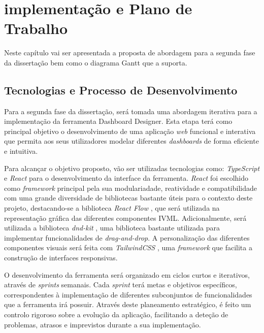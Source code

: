 
%

\chapter{implementação e Plano de Trabalho}
\label{cha:abordagem_plano}

Neste capítulo vai ser apresentada a proposta de abordagem para a segunda fase da dissertação bem como o diagrama Gantt que a suporta. 

\section{Tecnologias e Processo de Desenvolvimento} %
\label{sec:tecnologias_processo}

Para a segunda fase da dissertação, será tomada uma abordagem iterativa para a implementação da ferramenta Dashboard Designer. Esta etapa terá como principal objetivo o desenvolvimento de uma aplicação \textit{web} funcional e interativa que permita aos seus utilizadores modelar diferentes \textit{dashboards} de forma eficiente e intuitiva.

Para alcançar o objetivo proposto, vão ser utilizadas tecnologias como: \textit{TypeScript} \cite{typescript} e \textit{React} \cite{react} para o desenvolvimento da interface da ferramenta. \textit{React} foi escolhido como \textit{framework} principal pela sua modulariadade, reatividade e compatibilidade com uma grande diversidade de bibliotecas bastante úteis para o contexto deste projeto, destacando-se a biblioteca \textit{React Flow} \cite{reactflow}, que será utilizada na representação gráfica das diferentes componentes \gls{IVML}. Adicionalmente, será utilizada a biblioteca \textit{dnd-kit} \cite{dndkit}, uma biblioteca bastante utilizada para implementar funcionalidades de \textit{drag-and-drop}. A personalização das diferentes componentes visuais será feita com \textit{TailwindCSS} \cite{tailwindcss}, uma \textit{framework} que facilita a construção de interfaces responsivas.

O desenvolvimento da ferramenta será organizado em ciclos curtos e iterativos, através de \textit{sprints} semanais. Cada \textit{sprint} terá metas e objetivos específicos, correspondentes à implementação de diferentes subconjuntos de funcionalidades que a ferramenta irá possuir. Através deste planeamento estratégico, é feito um controlo rigoroso sobre a evolução da aplicação, facilitando a deteção de problemas, atrasos e imprevistos durante a sua implementação.

